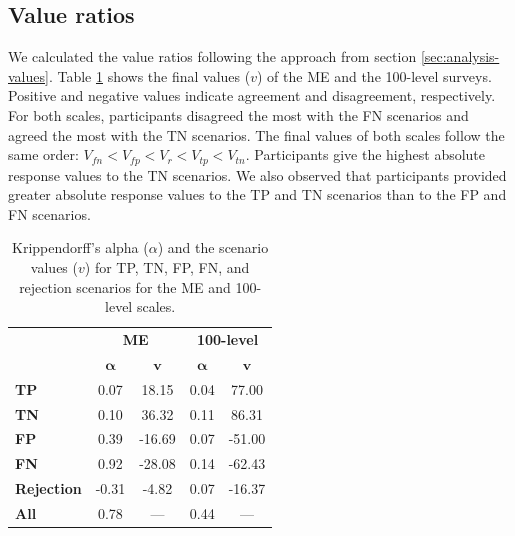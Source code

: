 \subsection{Value ratios}
\label{sec:results-value-ratios}
We calculated the value ratios following the approach from section \ref{sec:analysis-values}.
%
Table \ref{tab:values-reliability} shows the final values ($v$) of the ME and the 100-level surveys.
%
Positive and negative values indicate agreement and disagreement, respectively.
%
For both scales, participants disagreed the most with the FN scenarios and agreed the most with the TN scenarios.
%
The final values of both scales follow the same order: $V_{fn} < V_{fp} < V_{r} < V_{tp} < V_{tn}$.
%
Participants give the highest absolute response values to the TN scenarios.
%
We also observed that participants provided greater absolute response values to the TP and TN scenarios than to the FP and FN scenarios.
%
\begin{table}[t]
    \small
    \centering
    \begin{tabular}{lcccc}
        \toprule
                           & \multicolumn{2}{c}{\textbf{ME}} & \multicolumn{2}{c}{\textbf{100-level}}                                        \\
        \cmidrule(l){2-3} \cmidrule(l){4-5}
                           & $\boldsymbol{\alpha}$           & $\textbf{v}$                           & $\boldsymbol{\alpha}$ & $\textbf{v}$ \\
        \midrule
        \textbf{TP}        & 0.07                            & 18.15                                  & 0.04                  & 77.00        \\
        \textbf{TN}        & 0.10                            & 36.32                                  & 0.11                  & 86.31        \\
        \textbf{FP}        & 0.39                            & -16.69                                 & 0.07                  & -51.00       \\
        \textbf{FN}        & 0.92                            & -28.08                                 & 0.14                  & -62.43       \\
        \textbf{Rejection} & -0.31                           & -4.82                                  & 0.07                  & -16.37       \\
        \midrule
        \textbf{All}       & 0.78                            & ---                                    & 0.44                  & ---          \\
        \bottomrule
    \end{tabular}
    \caption{Krippendorff's alpha ($\alpha$) and the scenario values ($v$) for TP, TN, FP, FN, and rejection scenarios for the ME and 100-level scales.}
    \label{tab:values-reliability}
\end{table}

